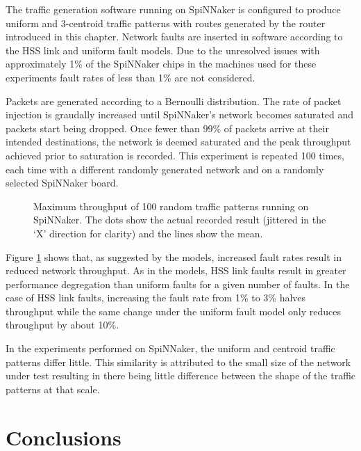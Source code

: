 			The traffic generation software running on SpiNNaker is configured to
			produce uniform and 3-centroid traffic patterns with routes generated by
			the router introduced in this chapter. Network faults are inserted in
			software according to the HSS link and uniform fault models. Due to the
			unresolved issues with approximately 1\% of the SpiNNaker chips in the
			machines used for these experiments fault rates of less than 1\% are not
			considered.
			
			Packets are generated according to a Bernoulli distribution. The rate of
			packet injection is graudally increased until SpiNNaker's network becomes
			saturated and packets start being dropped. Once fewer than 99\% of
			packets arrive at their intended destinations, the network is deemed
			saturated and the peak throughput achieved prior to saturation is
			recorded. This experiment is repeated 100 times, each time with a
			different randomly generated network and on a randomly selected SpiNNaker
			board.
			
			\begin{figure}
				\center
				
				\caption{Maximum throughput of \num{100} random traffic patterns
				running on SpiNNaker. The dots show the actual recorded result
				(jittered in the `X' direction for clarity) and the lines show the
				mean.}
				\label{fig:routing-hardware}
			\end{figure}
			
			Figure \ref{fig:routing-hardware} shows that, as suggested by the models,
			increased fault rates result in reduced network throughput. As in the
			models, HSS link faults result in greater performance degregation than
			uniform faults for a given number of faults. In the case of HSS link
			faults, increasing the fault rate from 1\% to 3\% halves throughput while
			the same change under the uniform fault model only reduces throughput by
			about 10\%.
			
			In the experiments performed on SpiNNaker, the uniform and centroid
			traffic patterns differ little. This similarity is attributed to the
			small size of the network under test resulting in there being little
			difference between the shape of the traffic patterns at that scale.
		
	\section{Conclusions}
		
